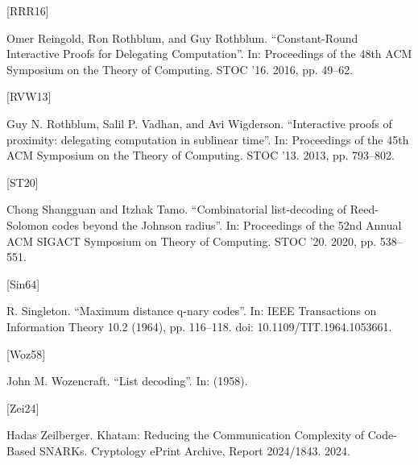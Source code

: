 \documentclass[11pt]{article}
\begin{document}
[RRR16]

Omer Reingold, Ron Rothblum, and Guy Rothblum. “Constant-Round Interactive Proofs
for Delegating Computation”. In: Proceedings of the 48th ACM Symposium on the Theory
of Computing. STOC ’16. 2016, pp. 49–62.

[RVW13]

Guy N. Rothblum, Salil P. Vadhan, and Avi Wigderson. “Interactive proofs of proximity:
delegating computation in sublinear time”. In: Proceedings of the 45th ACM Symposium on
the Theory of Computing. STOC ’13. 2013, pp. 793–802.

[ST20]

Chong Shangguan and Itzhak Tamo. “Combinatorial list-decoding of Reed-Solomon codes
beyond the Johnson radius”. In: Proceedings of the 52nd Annual ACM SIGACT Symposium
on Theory of Computing. STOC ’20. 2020, pp. 538–551.

[Sin64]

R. Singleton. “Maximum distance q-nary codes”. In: IEEE Transactions on Information
Theory 10.2 (1964), pp. 116–118. doi: 10.1109/TIT.1964.1053661.

[Woz58]

John M. Wozencraft. “List decoding”. In: (1958).

[Zei24]

Hadas Zeilberger. Khatam: Reducing the Communication Complexity of Code-Based SNARKs.
Cryptology ePrint Archive, Report 2024/1843. 2024.
\end{document}
